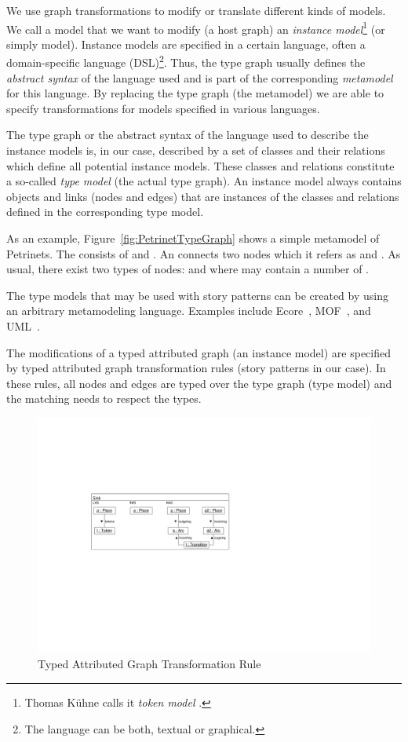 We use graph transformations to modify or translate different kinds of models.
We call a model that we want to modify (a host graph) an \emph{instance model}\footnote{Thomas K\"{u}hne calls it \emph{token model} \cite{Kue06}.} (or simply model).
Instance models are specified in a certain language, often a domain-specific language (DSL)\footnote{The language can be both, textual or graphical.}.
Thus, the type graph usually defines the \emph{abstract syntax} of the language used and is part of the corresponding \emph{metamodel} \cite{Kue06} for this language.
By replacing the type graph (the metamodel) we are able to specify transformations for models specified in various languages.

The type graph or the abstract syntax of the language used to describe the instance models
is, in our case, described by a set of classes and their relations which define all potential instance models.
These classes and relations constitute a so-called \emph{type model} (the actual type graph).
An instance model always contains objects and links (nodes and edges) that are instances of the classes and relations defined in the corresponding type model.

As an example, Figure~\ref{fig:PetrinetTypeGraph} shows a simple metamodel of Petrinets.
The  consists of  and .
An  connects two nodes which it refers as  and .
As usual, there exist two types of nodes:  and  where  may contain a number of .

The type models that may be used with story patterns can be created by using an arbitrary metamodeling language.
Examples include Ecore~\cite{SBP+08}, MOF~\cite{MOF05}, and UML~\cite{UML23}.

The modifications of a typed attributed graph (an instance model) are specified by typed attributed graph transformation rules (story patterns in our case).
In these rules, all nodes and edges are typed over the type graph (type model) and the matching needs to respect the types.

\begin{figure}[htb]
  \centering
  \includegraphics[scale=1]{figures/TypedGTRule}
  \caption{Typed Attributed Graph Transformation Rule}
  \label{fig:typedGTRule}
\end{figure}

